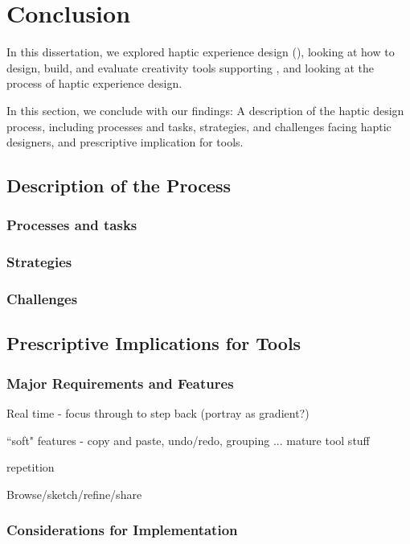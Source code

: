 
\chapter{Conclusion}
\label{ch:conclusion}

In this dissertation, we explored haptic experience design (\haxd), looking at how to design, build, and evaluate creativity tools supporting \haxd, and looking at the process of haptic experience design.

In this section, we conclude with our findings: A description of the haptic design process, including processes and tasks, strategies, and challenges facing haptic designers, and prescriptive implication for \haxd tools.

\section{Description of the \haxd Process}

\subsection{Processes and tasks}

\subsection{Strategies}

\subsection{Challenges}




\section{Prescriptive Implications for \haxd Tools}

\subsection{Major Requirements and Features}

Real time - focus through to step back (portray as gradient?)

``soft" features - copy and paste, undo/redo, grouping ... mature tool stuff

repetition

Browse/sketch/refine/share


\subsection{Considerations for Implementation}

